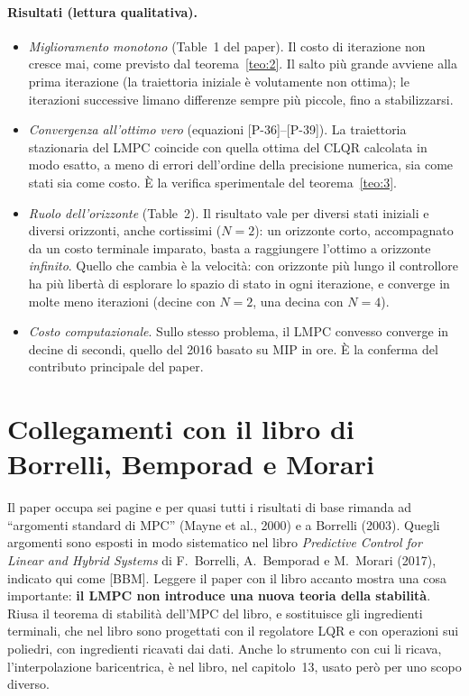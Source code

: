 \documentclass[11pt,a4paper]{article}
\theoremstyle{definition}
\theoremstyle{plain}
\theoremstyle{remark}
\newcommand{\eqp}[1]{\textup{[P-#1]}}   %
\begin{document}
\paragraph{Risultati (lettura qualitativa).}
\begin{itemize}
  \item \emph{Miglioramento monotono} (Table~1 del paper). Il costo di
        iterazione non cresce mai, come previsto dal teorema~\ref{teo:2}. Il
        salto più grande avviene alla prima iterazione (la traiettoria
        iniziale è volutamente non ottima); le iterazioni successive limano
        differenze sempre più piccole, fino a stabilizzarsi.
  \item \emph{Convergenza all'ottimo vero} (equazioni \eqp{36}--\eqp{39}). La
        traiettoria stazionaria del LMPC coincide con quella ottima del CLQR
        calcolata in modo esatto, a meno di errori dell'ordine della
        precisione numerica, sia come stati sia come costo. È la verifica
        sperimentale del teorema~\ref{teo:3}.
  \item \emph{Ruolo dell'orizzonte} (Table~2). Il risultato vale per diversi
        stati iniziali e diversi orizzonti, anche cortissimi ($N=2$): un
        orizzonte corto, accompagnato da un costo terminale imparato, basta a
        raggiungere l'ottimo a orizzonte \emph{infinito}. Quello che cambia è
        la velocità: con orizzonte più lungo il controllore ha più libertà di
        esplorare lo spazio di stato in ogni iterazione, e converge in molte
        meno iterazioni (decine con $N=2$, una decina con $N=4$).
  \item \emph{Costo computazionale}. Sullo stesso problema, il LMPC convesso
        converge in decine di secondi, quello del 2016 basato su MIP in ore.
        È la conferma del contributo principale del paper.
\end{itemize}

\section{Collegamenti con il libro di Borrelli, Bemporad e Morari}\label{sec:libro}

Il paper occupa sei pagine e per quasi tutti i risultati di base rimanda ad
``argomenti standard di MPC'' (Mayne et al., 2000) e a Borrelli (2003). Quegli
argomenti sono esposti in modo sistematico nel libro \emph{Predictive Control
for Linear and Hybrid Systems} di F.~Borrelli, A.~Bemporad e M.~Morari
(2017), indicato qui come [BBM]. Leggere il paper con il libro accanto mostra
una cosa importante: \textbf{il LMPC non introduce una nuova teoria della
stabilità}. Riusa il teorema di stabilità dell'MPC del libro, e sostituisce
gli ingredienti terminali, che nel libro sono progettati con il regolatore
LQR e con operazioni sui poliedri, con ingredienti ricavati dai dati. Anche lo
strumento con cui li ricava, l'interpolazione baricentrica, è nel libro, nel
capitolo~13, usato però per uno scopo diverso.
\end{document}
